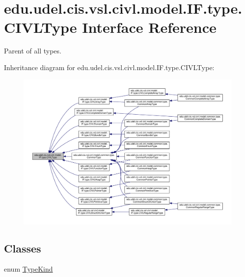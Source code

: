 \hypertarget{interfaceedu_1_1udel_1_1cis_1_1vsl_1_1civl_1_1model_1_1IF_1_1type_1_1CIVLType}{}\section{edu.\+udel.\+cis.\+vsl.\+civl.\+model.\+I\+F.\+type.\+C\+I\+V\+L\+Type Interface Reference}
\label{interfaceedu_1_1udel_1_1cis_1_1vsl_1_1civl_1_1model_1_1IF_1_1type_1_1CIVLType}


Parent of all types.  




Inheritance diagram for edu.\+udel.\+cis.\+vsl.\+civl.\+model.\+I\+F.\+type.\+C\+I\+V\+L\+Type\+:
\nopagebreak
\begin{figure}[H]
\begin{center}
\leavevmode
\includegraphics[width=350pt]{interfaceedu_1_1udel_1_1cis_1_1vsl_1_1civl_1_1model_1_1IF_1_1type_1_1CIVLType__inherit__graph}
\end{center}
\end{figure}
\subsection*{Classes}
\begin{DoxyCompactItemize}
\item 
enum \hyperlink{enumedu_1_1udel_1_1cis_1_1vsl_1_1civl_1_1model_1_1IF_1_1type_1_1CIVLType_1_1TypeKind}{Type\+Kind}
\end{DoxyCompactItemize}
